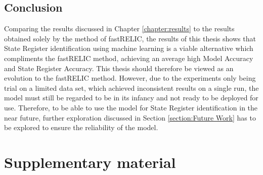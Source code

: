 \documentclass{tum-book}
\begin{document}
    
    \section{Conclusion}
    Comparing the results discussed in Chapter \ref{chapter:results} to the results obtained solely by the method of fastRELIC, the results of this thesis shows that State Register identification using machine learning is a viable alternative which compliments the fastRELIC method, achieving an average high Model Accuracy and State Register Accuracy. This thesis should therefore be viewed as an evolution to the fastRELIC method. However, due to the experiments only being trial on a limited data set, which achieved inconsistent results on a single run, the model must still be regarded to be in its infancy and not ready to be deployed for use. Therefore, to be able to use the model for State Register identification in the near future, further exploration discussed in Section \ref{section:Future Work} has to be explored to ensure the reliability of the model. 
    
      

\appendix

\chapter{Supplementary material}

\backmatter



\end{document}
